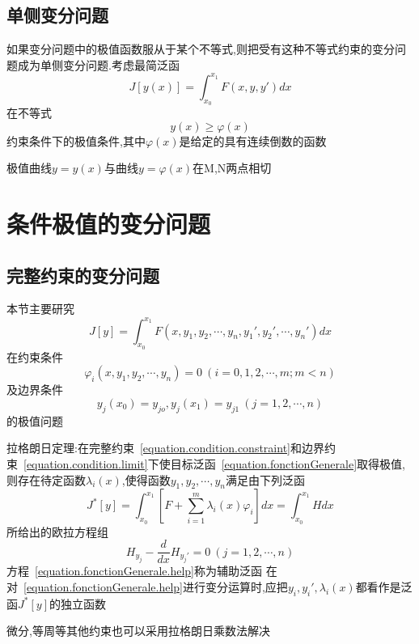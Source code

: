 \documentclass{article}
\begin{document}
\subsection{单侧变分问题}
如果变分问题中的极值函数服从于某个不等式,则把受有这种不等式约束的变分问题成为单侧变分问题.考虑最简泛函
\begin{equation}
 J[y(x)]=\int_{x_0}^{x_1}F(x,y,y')dx
\end{equation}
在不等式
\begin{equation}
 y(x) \geqslant \varphi(x)
\end{equation}
约束条件下的极值条件,其中$\varphi(x)$是给定的具有连续倒数的函数
\begin{theorem}
 极值曲线$y=y(x)$与曲线$y=\varphi(x)$在M,N两点相切
\end{theorem}

\section{条件极值的变分问题}
\subsection{完整约束的变分问题}
本节主要研究
\begin{equation}
J[y]=\int_{x_0}^{x_1}F(x,y_1,y_2, \cdots , y_n,y_1',y_2', \cdots , y_n')dx
\label{equation.fonctionGenerale}
\end{equation}
在约束条件
\begin{equation}
\varphi_i(x,y_1,y_2, \cdots , y_n)=0 ~ (i=0,1,2,\cdots ,m;m<n)
\label{equation.condition.constraint}
\end{equation}
及边界条件
\begin{equation}
y_j(x_0)=y_{jo},y_j(x_1)=y_{j1}~ (j=1,2,\cdots ,n)
\label{equation.condition.limit}
\end{equation}
的极值问题
\begin{theorem}
拉格朗日定理:在完整约束~\ref{equation.condition.constraint}和边界约束~\ref{equation.condition.limit}下使目标泛函~\ref{equation.fonctionGenerale}取得极值,则存在待定函数$\lambda_i(x)$,使得函数$y_1,y_2,\cdots,y_n$满足由下列泛函
\begin{equation}
J^{*}[y]=\int_{x_0}^{x_1}[F+\sum_{i=1}^{m}\lambda_i(x)\varphi_i]dx=\int_{x_0}^{x_1}Hdx
\label{equation.fonctionGenerale.help}
\end{equation}
所给出的欧拉方程组
$$H_{y_j} - \frac{d}{dx}H_{y_{j}'}=0 ~ (j=1,2,\cdots,n)$$
方程~\ref{equation.fonctionGenerale.help}称为辅助泛函
在对~\ref{equation.fonctionGenerale.help}进行变分运算时,应把$y_i,y_i',\lambda_i(x)$都看作是泛函$J^{*}[y]$的独立函数
\end{theorem}
微分,等周等其他约束也可以采用拉格朗日乘数法解决
\end{document}
